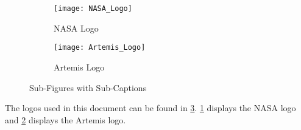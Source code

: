 \begin{figure}[H]
\begin{subfigure}[b]{0.5\textwidth}
   \centering 
   \texttt{[image: NASA\_Logo]}
   \caption{NASA Logo} 
   \label{fig:nasa-logo}
\end{subfigure}%
\begin{subfigure}[b]{0.5\textwidth}
   \centering 
   \texttt{[image: Artemis\_Logo]}
   \caption{Artemis Logo} 
   \label{fig:artemis-logo}
\end{subfigure}%
   \caption{Sub-Figures with Sub-Captions} 
   \label{fig:nasa-and-artemis-logos}
\end{figure}

The logos used in this document can be found in \ref{fig:nasa-and-artemis-logos}. 
\ref{fig:nasa-logo} displays the NASA logo and \ref{fig:artemis-logo} displays the Artemis logo.
